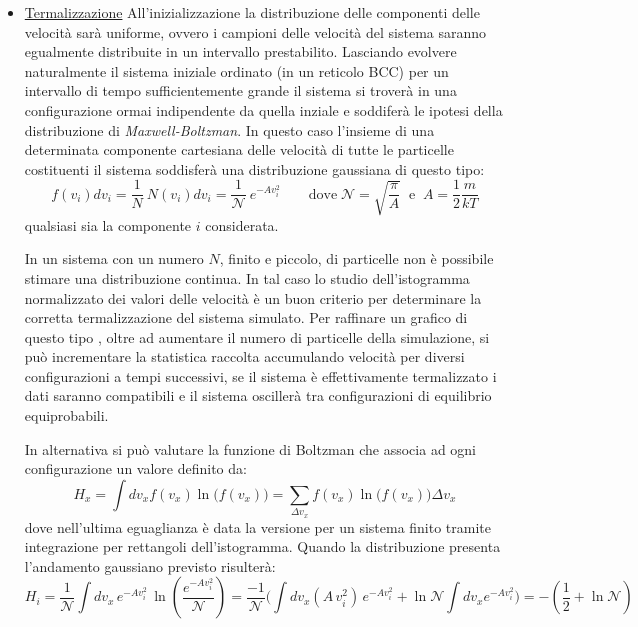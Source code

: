 \documentclass[11pt]{article}
\theoremstyle{plain}
\theoremstyle{remark}
\begin{document}
\begin{itemize}
\item \underline{Termalizzazione}\newline
All'inizializzazione la distribuzione delle componenti delle velocità sarà uniforme, ovvero i campioni delle velocità del sistema saranno egualmente distribuite in un intervallo prestabilito.
Lasciando evolvere naturalmente il sistema iniziale ordinato (in un reticolo BCC) per un intervallo di tempo sufficientemente grande il sistema si troverà in una configurazione ormai indipendente da quella inziale e soddiferà le ipotesi della distribuzione di \emph{Maxwell-Boltzman}.
In questo caso l'insieme di una determinata componente cartesiana delle velocità di tutte le particelle costituenti il sistema soddisferà una distribuzione gaussiana di questo tipo:
\begin{equation}
f(v_i) dv_i = \dfrac{1}{N} \: N(v_i) dv_i = \dfrac{1}{\mathcal{N}} \: e^{-A v_i^2} \qquad 
\textrm{dove} \; \mathcal{N} = \sqrt{\dfrac{\pi}{A}} \;\; \textrm{e} \;\; A = \dfrac{1}{2}\dfrac{m}{kT}
\end{equation}
qualsiasi sia la componente $i$ considerata.

In un sistema con un numero $N$, finito e piccolo, di particelle non è possibile stimare una distribuzione continua. In tal caso lo studio dell'istogramma normalizzato dei valori delle velocità è un buon criterio per determinare la corretta termalizzazione del sistema simulato. 
Per raffinare un grafico di questo tipo , oltre ad aumentare il numero di particelle della simulazione, si può incrementare la statistica raccolta accumulando velocità per diversi configurazioni a tempi successivi, se il sistema è effettivamente termalizzato i dati saranno compatibili e il sistema oscillerà tra configurazioni di equilibrio equiprobabili.

In alternativa si può valutare la funzione di Boltzman che associa ad ogni configurazione un valore definito da:
\begin{equation}
H_x = \int dv_x f(v_x) \ln{\biggr(f(v_x)\biggr)} = \sum_{\Delta v_x}^{}f(v_x) \ln{ \biggr(f(v_x)\biggr)} \Delta v_x
\end{equation} %
dove nell'ultima eguaglianza è data la versione per un sistema finito tramite integrazione per rettangoli dell'istogramma.
Quando la distribuzione presenta l'andamento gaussiano previsto risulterà:
\begin{equation}
H_i = \dfrac{1}{\mathcal{N}}\int dv_x \, e^{-A v_i^2} \, \ln{(\dfrac{e^{-A v_i^2}}{\mathcal{N}})} 
= \dfrac{-1}{\mathcal{N}} \Biggr( \int dv_x(A\, v_i^2)\, e^{-A v_i^2} + \ln{\mathcal{N}}\int dv_x e^{-A v_i^2}  \Biggr)
=- ( \dfrac{1}{2} + \ln{\mathcal{N}})
\end{equation}


\end{itemize}
\end{document}
